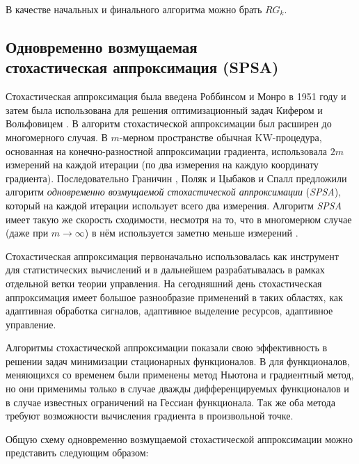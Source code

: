 В качестве начальных и финального алгоритма можно брать $RG_k$.



\subsection[Одновременно возмущаемая стохастическая аппроксимация (SPSA)]{Одновременно возмущаемая\\ стохастическая аппроксимация (SPSA)}
Стохастическая аппроксимация была введена Роббинсом и Монро в 1951 году \cite{Robbins&Monro:1951} и затем была использована для решения оптимизационный задач Кифером и Вольфовицем \cite{Kiefer&Wolfowitz:1952}. В \cite{Blum:1954} алгоритм стохастической аппроксимации был расширен до многомерного случая. В $m$-мерном пространстве обычная KW-процедура, основанная на конечно-разностной аппроксимации градиента, использовала $2m$ измерений на каждой итерации (по два измерения на каждую координату градиента). Последовательно Граничин \cite{Граничин:1989}, Поляк и Цыбаков \cite{Поляк&Цыбаков:1990} и Спалл \cite{Spall:1992} предложили алгоритм \emph{одновременно возмущаемой стохастической аппроксимации} (\emph{SPSA}), который на каждой итерации использует всего два измерения. Алгоритм \emph{SPSA} имеет такую же скорость сходимости, несмотря на то, что в многомерном случае (даже при $m \to \infty$) в нём используется заметно меньше измерений \cite{Spall:2005}.

Стохастическая аппроксимация первоначально использовалась как инструмент для статистических вычислений и в дальнейшем разрабатывалась в рамках отдельной ветки теории управления. На сегодняшний день стохастическая аппроксимация имеет большое разнообразие применений в таких областях, как адаптивная обработка сигналов, адаптивное выделение ресурсов, адаптивное управление.

Алгоритмы стохастической аппроксимации показали свою эффективность в решении задач минимизации стационарных функционалов. В \cite{Polyak:1987} для функционалов, меняющихся со временем были применены метод Ньютона и градиентный метод, но они применимы только в случае дважды дифференцируемых функционалов и в случае известных ограничений на Гессиан функционала. Так же оба метода требуют возможности вычисления градиента в произвольной точке.

Общую схему одновременно возмущаемой стохастической аппроксимации можно представить следующим образом:

